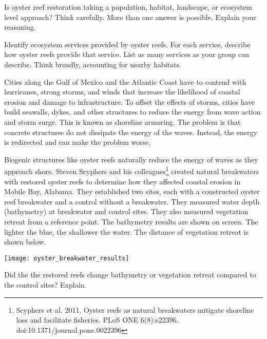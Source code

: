 \documentclass[12pt, addpoints, hidelinks]{exam}
\begin{document}
\begin{questions}

\question[5]
Is oyster reef restoration taking a population, habitat, landscape, or ecosystem level approach? Think carefully. More than one answer is possible. Explain your reasoning.


\question[5]
Identify ecosystem services provided by oyster reefs. For each service, describe how oyster reefs provide that service. List as many services as your group can describe. Think broadly, accounting for nearby habitats.


\newpage

Cities along the Gulf of Mexico and the Atlantic Coast have to contend with hurricanes, strong storms, and winds that increase the likelihood of coastal erosion and damage to infrastructure. To offset the effects of storms, cities have build seawalls, dykes, and other structures to reduce the energy from wave action and storm surge. This is known as shoreline armoring. The problem is that concrete structures do not dissipate the energy of the waves. Instead, the energy is redirected and can make the problem worse. 

Biogenic structures like oyster reefs naturally reduce the energy of waves as they approach shore. Steven Scyphers and his colleagues\footnote{Scyphers et al. 2011. Oyster reefs as natural breakwaters mitigate shoreline loss and facilitate fisheries. PLoS ONE 6(8):e22396. doi:10.1371/journal.pone.0022396} created natural breakwaters with restored oyster reefs to determine how they affected coastal erosion in Mobile Bay, Alabama. They established two sites, each with a constructed oyster reef breakwater and a control without a breakwater.  They measured water depth (bathymetry) at breakwater and control sites. They also measured vegetation retreat from a reference point. The bathymetry results are shown on screen. The lighter the blue, the shallower the water. The distance of vegetation retreat is shown below.

\texttt{[image: oyster\_breakwater\_results]}

\question[5]
Did the the restored reefs change bathymetry or vegetation retreat compared to the control sites? Explain.

\newpage



\end{questions}
\end{document}

